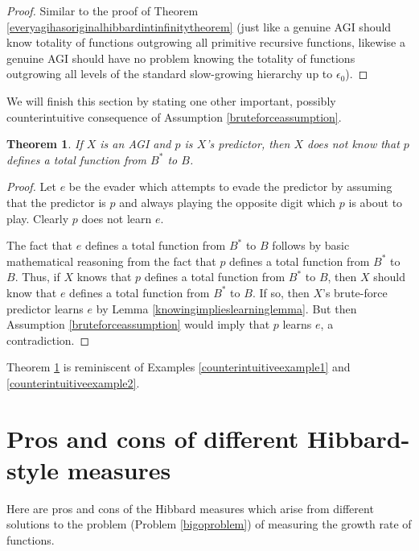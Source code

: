 \documentclass{article}
\newtheorem{theorem}{Theorem}
\begin{document}
\begin{proof}
    Similar to the proof of Theorem \ref{everyagihasoriginalhibbardintinfinitytheorem}
    (just like a genuine AGI should know totality of functions outgrowing all
    primitive recursive functions, likewise a genuine AGI should have no problem
    knowing the totality of functions outgrowing all levels of the standard
    slow-growing hierarchy up to $\epsilon_0$).
\end{proof}

We will finish this section by stating one other important, possibly
counterintuitive consequence of Assumption \ref{bruteforceassumption}.

\begin{theorem}
\label{counterintuitivetheorem}
    If $X$ is an AGI and $p$ is $X$'s predictor, then $X$ does not know that
    $p$ defines a total function from $B^*$ to $B$.
\end{theorem}

\begin{proof}
    Let $e$ be the evader which attempts to evade the predictor by assuming that
    the predictor is $p$ and always playing the opposite digit which $p$ is
    about to play. Clearly $p$ does not learn $e$.

    The fact that $e$ defines a total function from $B^*$ to $B$ follows
    by basic mathematical reasoning from the fact that $p$ defines a total
    function from $B^*$ to $B$. Thus, if $X$ knows that $p$ defines a total
    function from $B^*$ to $B$, then $X$ should know that $e$ defines a total
    function from $B^*$ to $B$. If so, then $X$'s brute-force predictor learns
    $e$ by Lemma \ref{knowingimplieslearninglemma}. But then
    Assumption \ref{bruteforceassumption} would imply that $p$ learns $e$,
    a contradiction.
\end{proof}

Theorem \ref{counterintuitivetheorem} is reminiscent of
Examples \ref{counterintuitiveexample1} and \ref{counterintuitiveexample2}.

\section{Pros and cons of different Hibbard-style measures}
\label{prosandconssection}

Here are pros and cons of the Hibbard measures which arise from different solutions
to the problem (Problem \ref{bigoproblem}) of measuring the growth rate of functions.
\end{document}
